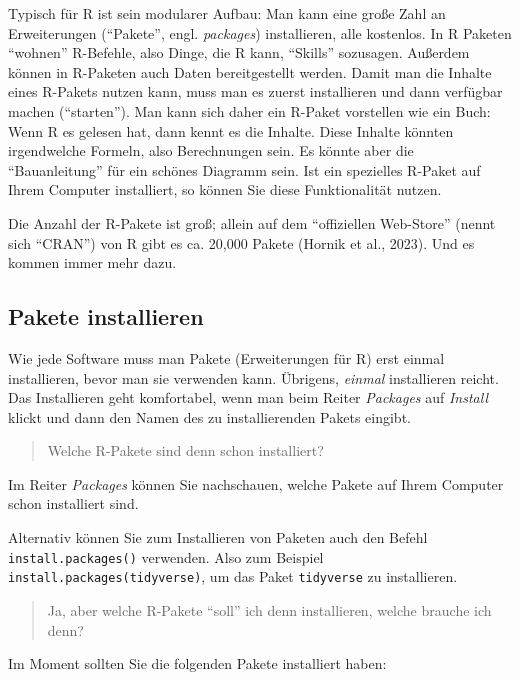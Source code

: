\documentclass[
  letterpaper,
  twoside,
  open=any]{scrbook}
\theoremstyle{definition}
\theoremstyle{definition}
\theoremstyle{definition}
\theoremstyle{remark}
\begin{document}
Typisch für R ist sein modularer Aufbau: Man kann eine große Zahl an
Erweiterungen (\enquote{Pakete}, engl. \emph{packages}) installieren,
alle kostenlos. In R Paketen \enquote{wohnen} R-Befehle, also Dinge, die
R kann, \enquote{Skills} sozusagen. Außerdem können in R-Paketen auch
Daten bereitgestellt werden. Damit man die Inhalte eines R-Pakets nutzen
kann, muss man es zuerst installieren und dann verfügbar machen
(\enquote{starten}). Man kann sich daher ein R-Paket vorstellen wie ein
Buch: Wenn R es gelesen hat, dann kennt es die Inhalte. Diese Inhalte
könnten irgendwelche Formeln, also Berechnungen sein. Es könnte aber die
\enquote{Bauanleitung} für ein schönes Diagramm sein. Ist ein spezielles
R-Paket auf Ihrem Computer installiert, so können Sie diese
Funktionalität nutzen.

Die Anzahl der R-Pakete ist groß; allein auf dem \enquote{offiziellen
Web-Store} (nennt sich \enquote{CRAN}) von R gibt es ca. 20,000 Pakete
(Hornik et al., 2023). Und es kommen immer mehr dazu.

\subsection{Pakete installieren}\label{sec-install-r-pckgs}

Wie jede Software muss man Pakete (Erweiterungen für R) erst einmal
installieren, bevor man sie verwenden kann. Übrigens, \emph{einmal}
installieren reicht. Das Installieren geht komfortabel, wenn man beim
Reiter \emph{Packages} auf \emph{Install} klickt und dann den Namen des
zu installierenden Pakets eingibt.

\begin{quote}
{} Welche R-Pakete sind denn schon installiert?
\end{quote}

Im Reiter \emph{Packages} können Sie nachschauen, welche Pakete auf
Ihrem Computer schon installiert sind.

Alternativ können Sie zum Installieren von Paketen auch den Befehl
\texttt{install.packages()} verwenden. Also zum Beispiel
\texttt{install.packages(tidyverse)}, um das Paket \texttt{tidyverse} zu
installieren.

\begin{quote}
{} Ja, aber welche R-Pakete \enquote{soll} ich denn
installieren, welche brauche ich denn?
\end{quote}

Im Moment sollten Sie die folgenden Pakete installiert haben:
\end{document}
